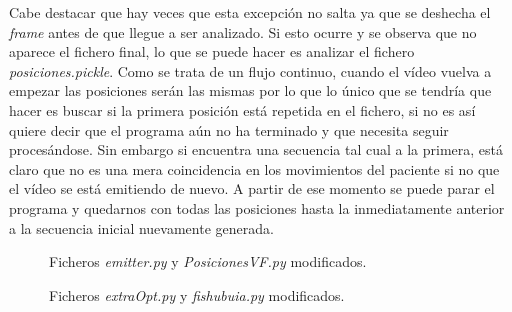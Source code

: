 Cabe destacar que hay veces que esta excepción no salta ya que se deshecha el \textit{frame} antes de que llegue a ser analizado. Si esto ocurre y se observa que no aparece el fichero final, lo que se puede hacer es analizar el fichero \textit{posiciones.pickle}. Como se trata de un flujo continuo, cuando el vídeo vuelva a empezar las posiciones serán las mismas por lo que lo único que se tendría que hacer es buscar si la primera posición está repetida en el fichero, si no es así quiere decir que el programa aún no ha terminado y que necesita seguir procesándose. Sin embargo si encuentra una secuencia tal cual a la primera, está claro que no es una mera coincidencia en los movimientos del paciente si no que el vídeo se está emitiendo de nuevo. A partir de ese momento se puede parar el programa y quedarnos con todas las posiciones hasta la inmediatamente anterior a la secuencia inicial nuevamente generada. 

\begin{figure}[H]
 \centering
  \vspace{1mm}
 \caption{Ficheros \textit{emitter.py} y \textit{PosicionesVF.py} modificados. }
 \label{f:ficherosModificados}
\end{figure}

\begin{figure}[H]
 \centering
  \vspace{1mm}
 \caption{Ficheros \textit{extraOpt.py} y \textit{fishubuia.py} modificados. }
 \label{f:ficherosModificados2}
\end{figure}



